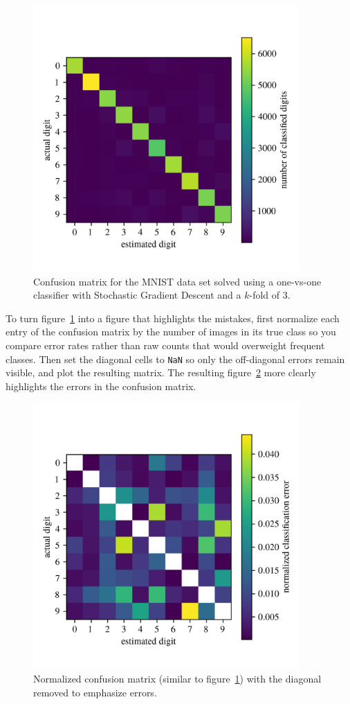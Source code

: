 \documentclass[12pt,letter]{article}
\begin{document}
\begin{figure}[H]
    \centering
    \includegraphics[width=4.0in]{../figures/digit_confusion_matrix.png}
    \caption{Confusion matrix for the MNIST data set solved using a one-vs-one classifier with Stochastic Gradient Descent and a $k$-fold of 3.}
    \label{fig:digit_confusion_matrix}
\end{figure}



To turn figure~\ref{fig:digit_confusion_matrix} into a figure that highlights the mistakes, first normalize each entry of the confusion matrix by the number of images in its true class so you compare error rates rather than raw counts that would overweight frequent classes. Then set the diagonal cells to \texttt{NaN} so only the off-diagonal errors remain visible, and plot the resulting matrix. The resulting figure~\ref{fig:digit_confusion_matrix_2} more clearly highlights the errors in the confusion matrix.


\begin{figure}[H]
    \centering
    \includegraphics[width=4.0in]{../figures/digit_confusion_matrix_error.png}
    \caption{Normalized confusion matrix (similar to figure~\ref{fig:digit_confusion_matrix}) with the diagonal removed to emphasize errors.}
    \label{fig:digit_confusion_matrix_2}
\end{figure}
\end{document}
